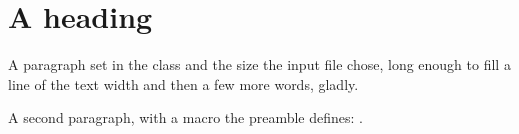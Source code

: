 

\section{A heading}
A paragraph set in the class and the size the input file chose, long enough
to fill a line of the text width and then a few more words, gladly.

A second paragraph, with a macro the preamble defines: \greeting.

